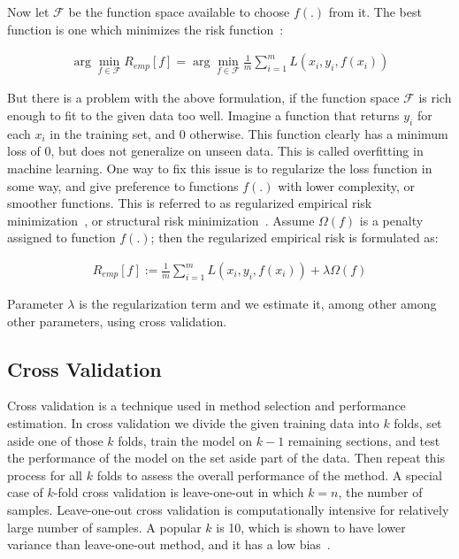 Now let $\mathcal{F}$ be the function space available to choose $f(.)$ from it. The best function is one which minimizes the risk function~\cite[p. 67]{learning-with-kernels}:

\begin{align}
  \arg \min_{f \in \mathcal{F}} R_{emp}[f] = \arg \min_{f \in \mathcal{F}} \frac{1}{m}\sum_{i = 1}^{m} L(x_i, y_i, f(x_i))
\end{align}

But there is a problem with the above formulation, if the function space $\mathcal{F}$ is rich enough to fit to the given data too well. Imagine a function that returns $y_i$ for each $x_i$ in the training set, and $0$ otherwise. This function clearly has a minimum loss of $0$, but does not generalize on unseen data. This is called overfitting in machine learning. One way to fix this issue is to regularize the loss function in some way, and give preference to functions $f(.)$ with lower complexity, or smoother functions. This is referred to as regularized empirical risk minimization~\cite[Ch. 4.1]{learning-with-kernels}, or structural risk minimization~\cite[Ch. 4.1]{thenatureofstatisticallearningtheory}. Assume $\Omega(f)$ is a penalty assigned to function $f(.)$; then the regularized empirical risk is formulated as:

\begin{align}
  R_{emp}[f] := \frac{1}{m}\sum_{i = 1}^{m} L(x_i, y_i, f(x_i)) + \lambda \Omega(f)
  \label{frm:bkg:emp-regularized}
\end{align}

Parameter $\lambda$ is the regularization term and we estimate it, among other among other parameters, using cross validation.

\subsection{Cross Validation}
\label{chap:cross-validation}

Cross validation is a technique used in method selection and performance estimation. In cross validation we divide the given training data into $k$ folds, set aside one of those $k$ folds, train the model on $k - 1$ remaining sections, and test the performance of the model on the set aside part of the data. Then repeat this process for all $k$ folds to assess the overall performance of the method. A special case of $k$-fold cross validation is leave-one-out in which $k=n$, the number of samples. Leave-one-out cross validation is computationally intensive for relatively large number of samples. A popular $k$ is 10, which is shown to have lower variance than leave-one-out method, and it has a low bias~\cite[Ch. 7]{statistical-learning}. 

